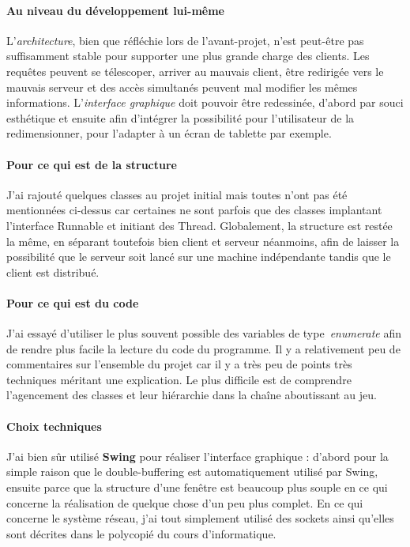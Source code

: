\documentclass[a4paper,12pt]{report}
\begin{document}
\paragraph{Au niveau du développement lui-même}
L'\emph{architecture}, bien que réfléchie lors de l'avant-projet, n'est peut-être pas suffisamment stable pour supporter une plus grande charge des clients. Les requêtes peuvent se télescoper, arriver au mauvais client, être redirigée vers le mauvais serveur et des accès simultanés peuvent mal modifier les mêmes informations. L'\emph{interface graphique} doit pouvoir être redessinée, d'abord par souci esthétique et ensuite afin d'intégrer la possibilité pour l'utilisateur de la redimensionner, pour l'adapter à un écran de tablette par exemple.
\paragraph{Pour ce qui est de la structure}
J'ai rajouté quelques classes au projet initial mais toutes n'ont pas été mentionnées ci-dessus car certaines ne sont parfois que des classes implantant l'interface Runnable et initiant des Thread. Globalement, la structure est restée la même, en séparant toutefois bien client et serveur néanmoins, afin de laisser la possibilité que le serveur soit lancé sur une machine indépendante tandis que le client est distribué.
\paragraph{Pour ce qui est du code}
J'ai essayé d'utiliser le plus souvent possible des variables de type \emph{enumerate} afin de rendre plus facile la lecture du code du programme. Il y a relativement peu de commentaires sur l'ensemble du projet car il y a très peu de points très techniques méritant une explication. Le plus difficile est de comprendre l'agencement des classes et leur hiérarchie dans la chaîne aboutissant au jeu.
\paragraph{Choix techniques}
J'ai bien sûr utilisé \textbf{Swing} pour réaliser l'interface graphique : d'abord pour la simple raison que le double-buffering est automatiquement utilisé par Swing, ensuite parce que la structure d'une fenêtre est beaucoup plus souple en ce qui concerne la réalisation de quelque chose d'un peu plus complet. En ce qui concerne le système réseau, j'ai tout simplement utilisé des sockets ainsi qu'elles sont décrites dans le polycopié du cours d'informatique.
\end{document}
